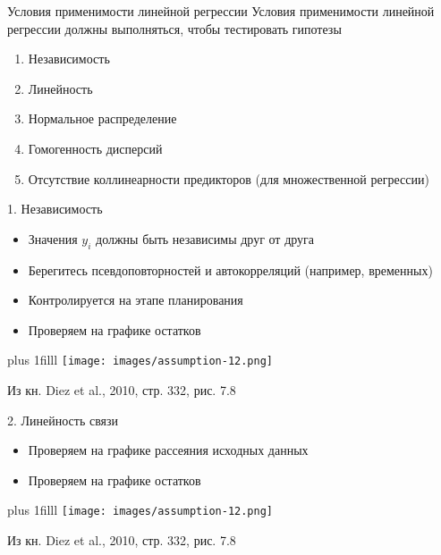 \documentclass[
  ignorenonframetext,
  t,xcolor=table]{beamer}
\providecommand{\tightlist}{%
  \setlength{\itemsep}{0pt}\setlength{\parskip}{0pt}}
\begin{document}
\begin{frame}{Условия применимости линейной регрессии}
\protect\hypertarget{ux443ux441ux43bux43eux432ux438ux44f-ux43fux440ux438ux43cux435ux43dux438ux43cux43eux441ux442ux438-ux43bux438ux43dux435ux439ux43dux43eux439-ux440ux435ux433ux440ux435ux441ux441ux438ux438-1}{}
Условия применимости линейной регрессии должны выполняться, чтобы
тестировать гипотезы

\begin{enumerate}
\tightlist
\item
  Независимость
\item
  Линейность
\item
  Нормальное распределение
\item
  Гомогенность дисперсий
\item
  Отсутствие коллинеарности предикторов (для множественной регрессии)
\end{enumerate}
\end{frame}

\begin{frame}{1. Независимость}
\protect\hypertarget{ux43dux435ux437ux430ux432ux438ux441ux438ux43cux43eux441ux442ux44c}{}
\begin{itemize}
\tightlist
\item
  Значения \(y _i\) должны быть независимы друг от друга
\item
  Берегитесь псевдоповторностей и автокорреляций (например, временных)
\item
  Контролируется на этапе планирования
\item
  Проверяем на графике остатков
\end{itemize}

\vskip0pt plus 1filll \centering
\texttt{[image: images/assumption-12.png]}

\raggedright

\tiny Из кн. Diez et al., 2010, стр. 332, рис. 7.8
\end{frame}

\begin{frame}{2. Линейность связи}
\protect\hypertarget{ux43bux438ux43dux435ux439ux43dux43eux441ux442ux44c-ux441ux432ux44fux437ux438}{}
\begin{itemize}
\tightlist
\item
  Проверяем на графике рассеяния исходных данных
\item
  Проверяем на графике остатков
\end{itemize}

\vskip0pt plus 1filll \centering
\texttt{[image: images/assumption-12.png]}

\raggedright

\tiny Из кн. Diez et al., 2010, стр. 332, рис. 7.8
\end{frame}
\end{document}
